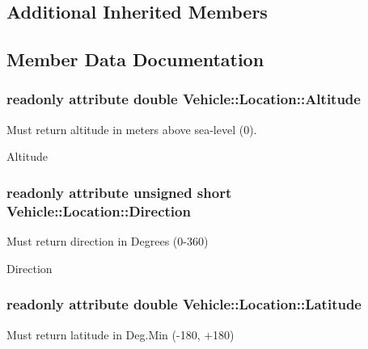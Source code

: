 \subsection*{Additional Inherited Members}


\subsection{Member Data Documentation}
\hypertarget{interfaceVehicle_1_1Location_a9b727284c7d2a15fbabe955f25825573}{
\subsubsection[{Altitude}]{\setlength{\rightskip}{0pt plus 5cm}readonly attribute double Vehicle\-::\-Location\-::\-Altitude}}\label{interfaceVehicle_1_1Location_a9b727284c7d2a15fbabe955f25825573}


Must return altitude in meters above sea-\/level (0). 

Altitude \hypertarget{interfaceVehicle_1_1Location_af5a0e558b6f69acbededf01206746b05}{
\subsubsection[{Direction}]{\setlength{\rightskip}{0pt plus 5cm}readonly attribute unsigned short Vehicle\-::\-Location\-::\-Direction}}\label{interfaceVehicle_1_1Location_af5a0e558b6f69acbededf01206746b05}


Must return direction in Degrees (0-\/360) 

Direction \hypertarget{interfaceVehicle_1_1Location_ad58f91b7f161b89fc27de31ef7cc140d}{
\subsubsection[{Latitude}]{\setlength{\rightskip}{0pt plus 5cm}readonly attribute double Vehicle\-::\-Location\-::\-Latitude}}\label{interfaceVehicle_1_1Location_ad58f91b7f161b89fc27de31ef7cc140d}


Must return latitude in Deg.\-Min (-\/180, +180) 

